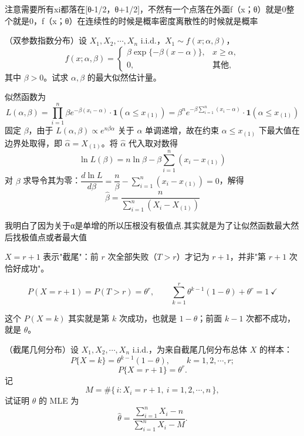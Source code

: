 \begin{dxtips}
    注意需要所有xi都落在[θ-1/2，θ+1/2]，不然有一个点落在外面f（x；θ）就是0整个就是0，f（x；θ）在连续性的时候是概率密度离散性的时候就是概率
\end{dxtips}
\begin{homework}[10]
（双参数指数分布）设 \(X_1,X_2,\cdots,X_n\) i.i.d.，\(X_1\sim f(x;\alpha,\beta)\)，
\[
f(x;\alpha,\beta)=
\begin{cases}
\beta \exp\{-\beta(x-\alpha)\}, & x\ge \alpha,\\
0, & \text{其他},
\end{cases}
\]
其中 \(\beta>0\)。试求 \(\alpha,\beta\) 的最大似然估计量。
\end{homework}

\begin{solution}
似然函数为
\[
L(\alpha,\beta) = \prod_{i=1}^n \beta e^{-\beta(x_i-\alpha)} \cdot \mathbf{1}(\alpha \leq x_{(1)}) = \beta^n e^{-\beta\sum_{i=1}^n(x_i-\alpha)} \cdot \mathbf{1}(\alpha \leq x_{(1)})
\]
固定 $\beta$，由于 $L(\alpha,\beta) \propto e^{n\beta\alpha}$ 关于 $\alpha$ 单调递增，故在约束 $\alpha \leq x_{(1)}$ 下最大值在边界处取得，即 $\hat{\alpha} = X_{(1)}$。将 $\hat{\alpha}$ 代入取对数得
\[
\ln L(\beta) = n\ln\beta - \beta\sum_{i=1}^n(x_i - x_{(1)})
\]
对 $\beta$ 求导令其为零：$\dfrac{d\ln L}{d\beta} = \dfrac{n}{\beta} - \sum_{i=1}^n(x_i - x_{(1)}) = 0$，解得
\[
\hat{\beta} = \frac{n}{\sum_{i=1}^n(X_i - X_{(1)})}
\]
\end{solution}
\begin{dxtips}
    我明白了因为关于α是单增的所以压根没有极值点.其实就是为了让似然函数最大然后找极值点或者最大值
\end{dxtips}
 \begin{note}[截尾几何分布]
$X=r+1$ 表示"截尾"：前 $r$ 次全部失败（$T>r$）才记为 $r+1$，并非"第 $r+1$ 次恰好成功"。

\[
P(X=r+1)=P(T>r)=\theta^r,
\qquad
\sum_{k=1}^r\theta^{k-1}(1-\theta)+\theta^r=1\ \checkmark
\]
\end{note}
\begin{dxtips}
  这个 $P(X=k)$ 其实就是第 $k$ 次成功，也就是 $1-\theta$；前面 $k-1$ 次都不成功，就是 $\theta$。
\end{dxtips}
\begin{homework}[11]
（截尾几何分布）设 \(X_1,X_2,\cdots,X_n\) i.i.d.，为来自截尾几何分布总体 \(X\) 的样本：
\[
P\{X=k\}=\theta^{k-1}(1-\theta),\qquad k=1,2,\cdots,r;
\]
\[
P\{X=r+1\}=\theta^r.
\]
记
\[
M=\#\{\,i: X_i=r+1,\ i=1,2,\cdots,n\,\},
\]
试证明 \(\theta\) 的 MLE 为
\[
\hat{\theta}
=
\frac{\sum_{i=1}^n X_i-n}{\sum_{i=1}^n X_i-M}.
\]
\end{homework}


